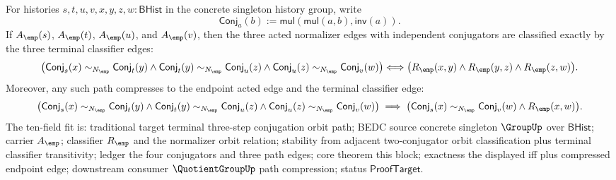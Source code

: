 \begin{theorem}
\label{thm:group-singleton-three-conjugator-orbit-path-compression}
For histories $s,t,u,v,x,y,z,w:\mathsf{BHist}$ in the concrete singleton
history group, write
$$
\mathsf{Conj}_a(b):=\mathsf{mul}(\mathsf{mul}(a,b),\mathsf{inv}(a)).
$$
If $A_{\emp}(s)$, $A_{\emp}(t)$, $A_{\emp}(u)$, and $A_{\emp}(v)$, then the
three acted normalizer edges with independent conjugators are classified
exactly by the three terminal classifier edges:
$$
\bigl(
\mathsf{Conj}_s(x)\sim_{N_{\emp}}\mathsf{Conj}_t(y)
\land
\mathsf{Conj}_t(y)\sim_{N_{\emp}}\mathsf{Conj}_u(z)
\land
\mathsf{Conj}_u(z)\sim_{N_{\emp}}\mathsf{Conj}_v(w)
\bigr)
\Longleftrightarrow
\bigl(R_{\emp}(x,y)\land R_{\emp}(y,z)\land R_{\emp}(z,w)\bigr).
$$
Moreover, any such path compresses to the endpoint acted edge and the terminal
classifier edge:
$$
\bigl(
\mathsf{Conj}_s(x)\sim_{N_{\emp}}\mathsf{Conj}_t(y)
\land
\mathsf{Conj}_t(y)\sim_{N_{\emp}}\mathsf{Conj}_u(z)
\land
\mathsf{Conj}_u(z)\sim_{N_{\emp}}\mathsf{Conj}_v(w)
\bigr)
\implies
\bigl(\mathsf{Conj}_s(x)\sim_{N_{\emp}}\mathsf{Conj}_v(w)
\land R_{\emp}(x,w)\bigr).
$$
The ten-field fit is: traditional target terminal three-step conjugation orbit
path; BEDC source concrete singleton $\GroupUp$ over $\mathsf{BHist}$; carrier
$A_{\emp}$; classifier $R_{\emp}$ and the normalizer orbit relation; stability
from adjacent two-conjugator orbit classification plus terminal classifier
transitivity; ledger the four conjugators and three path edges; core theorem
this block; exactness the displayed iff plus compressed endpoint edge;
downstream consumer $\QuotientGroupUp$ path compression; status
$\mathsf{ProofTarget}$.
\end{theorem}
